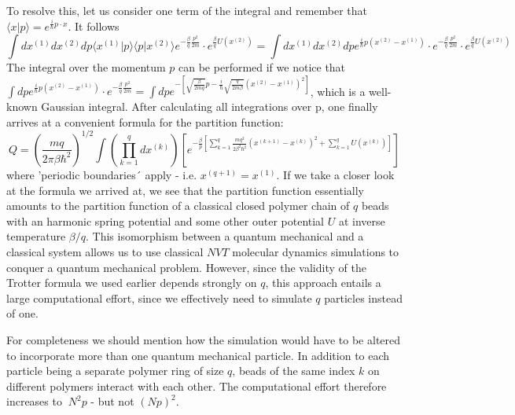 To resolve this, let us consider one term of the integral and remember that $\langle x | p \rangle = e^{\frac{i}{\hbar}p\cdot x}$. It follows 
\begin{equation}
\int dx^{(1)}dx^{(2)} dp \langle x^{(1)} | p \rangle \langle p | x^{(2)}\rangle e^{-\frac{\beta}{q} \frac{p^2}{2m}} \cdot e^{\frac{\beta}{q}U(x^{(2)})} = \int dx^{(1)} dx^{(2)} dp e^{\frac{i}{\hbar}p(x^{(2)}-x^{(1)})} \cdot e^{-\frac{\beta}{q} \frac{p^2}{2m}} \cdot e^{\frac{\beta}{q}U(x^{(2)})}
\end{equation}
The integral over the momentum $p$ can be performed if we notice that $\int dp e^{\frac{i}{\hbar}p(x^{(2)}-x^{(1)})} \cdot e^{-\frac{\beta}{q} \frac{p^2}{2m}} = \int dp e^{-\left[\sqrt{\frac{\beta}{2mq}}p-\frac{i}{\hbar}\sqrt{\frac{q}{2m\beta}}\left(x^{(2)}-x^{(1)}\right)^2\right]}$, which is a well-known Gaussian integral. After calculating all integrations over p, one finally arrives at a convenient formula for the partition function: 
\begin{equation}
Q = \left(\frac{mq}{2\pi\beta\hbar^2}\right)^{1/2} \int \left(\prod_{k=1}^{q} dx^{(k)}\right) \left[ e^{-\frac{\beta}{p}\left[\sum_{k=1}^{q} \frac{mq^2}{2\beta^2\hbar^2}(x^{(k+1)}-x^{(k)})^2 + \sum_{k=1}^{q} U(x^{(k)})\right]}\right]
\end{equation}
where 'periodic boundaries´ apply - i.e. $x^{(q+1)} = x^{(1)}$. If we take a closer look at the formula we arrived at, we see that the partition function essentially amounts to the partition function of a classical closed polymer chain of $q$ beads with an harmonic spring potential and some other outer potential $U$ at inverse temperature $\beta/q$. This isomorphism between a quantum mechanical and a classical system allows us to use classical $NVT$ molecular dynamics simulations to conquer a quantum mechanical problem. However, since the validity of the Trotter formula we used earlier depends strongly on $q$, this approach entails a large computational effort, since we effectively need to simulate $q$ particles instead of one. 

For completeness we should mention how the simulation would have to be altered to incorporate more than one quantum mechanical particle. In addition to each particle being a separate polymer ring of size $q$, beads of the same index $k$ on different polymers interact with each other. The computational effort therefore increases to $~N^2p$ - but not $(Np)^2$.
